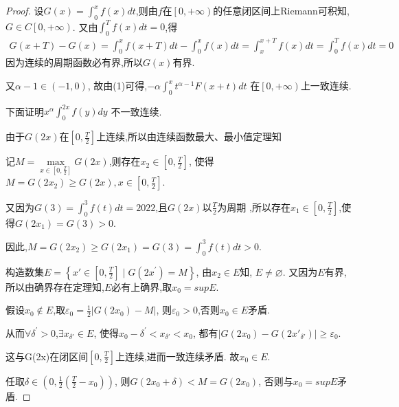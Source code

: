 \documentclass[lang=cn,newtx,10pt,scheme=chinese]{elegantbook}
\begin{document}
\begin{proof}
设$G(x)=\int_0^x{f\left( x \right)}dt$,则由$f$在$\left[ 0,+\infty \right)$的任意闭区间上Riemann可积知,
$G\in C\left[ 0,+\infty \right) $.
又由$\int_0^T{f\left( x \right)}dt=0$,得
\begin{equation}
  \begin{split}
    G\left( x+T \right) -G\left( x \right) =\int_0^x{f\left( x+T \right)}dt-\int_0^x{f\left( x \right)}dt=\int_x^{x+T}{f\left( x \right)}dt=\int_0^T{f\left( x \right)}dt=0
  \end{split}
  \nonumber
\end{equation}
因为连续的周期函数必有界,所以$G(x)$有界.

又$\alpha -1\in \left( -1,0 \right) $,
故由(1)可得,$-\alpha \int_0^x{t^{\alpha -1}F\left( x+t \right)}dt$
在$\left[ 0,+\infty \right) $上一致连续.

下面证明$x^{\alpha}\int_0^{2x}{f\left( y \right) dy}$
不一致连续.

由于$G(2x)$在$\left[ 0,\frac{T}{2} \right] $上连续,所以由连续函数最大、最小值定理知

记$M=\underset{x\in \left[ 0,\frac{T}{2} \right]}{\max}G\left( 2x \right) $,则存在$x_2\in \left[ 0,\frac{T}{2} \right] $,
使得$M=G\left( 2x_2 \right) \geqslant G\left( 2x \right) ,x\in \left[ 0,\frac{T}{2} \right] $.

又因为$G(3)=\int_0^3{f\left( t \right) dt}=2022$,且$G(2x)$以$\frac{T}{2}$为周期
,所以存在$x_1\in \left[ 0,\frac{T}{2} \right] $,使得$G(2x_1)=G(3)>0$.

因此,$M=G{\left( 2x_2 \right)}\geqslant G(2x_1)=G\left( 3 \right) =\int_0^3{f\left( t \right) dt}>0$.

构造数集$E=\left\{ x'\in \left[ 0,\frac{T}{2} \right] \mid G\left( 2x^{\prime} \right) =M \right\} $,
由$x_2\in E$知,
$E\ne \varnothing $.
又因为$E$有界,所以由确界存在定理知,$E$必有上确界,取$x_0=supE$.

假设$x_0\notin E$,取$\varepsilon _0=\frac{1}{2}\left| G\left( 2x_0 \right) -M \right|$,
则$\varepsilon _0>0$,否则$x_0\in E$矛盾.

从而$\forall \delta ^{\prime}>0$,$\exists x_{\delta'}\in E$,
使得$ x_0-\delta ^{\prime}<x_{\delta'}<x_0$,
都有$\left| G\left( 2x_0 \right) -G\left( 2x'_{\delta'} \right) \right|\geqslant \varepsilon _0$.

这与G(2x)在闭区间$\left[ 0,\frac{T}{2} \right]$上连续,进而一致连续矛盾.
故$x_0\in E$.

任取$\delta \in \left( 0,\frac{1}{2}\left( \frac{T}{2}-x_0 \right) \right) $,
则$G\left( 2x_0+\delta \right) <M=G\left( 2x_0 \right) $,
否则与$x_0=supE$矛盾.


\end{proof}
\end{document}
